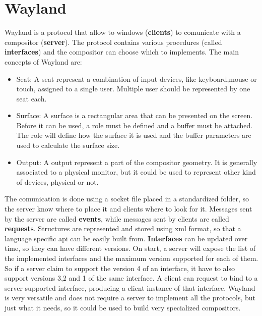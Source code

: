 \chapter{Wayland}
Wayland is a protocol that allow to windows (\textbf{clients}) to comunicate with a compositor (\textbf{server}).
The protocol contains various procedures (called \textbf{interfaces}) and the compositor can choose which to implements.
The main concepts of Wayland are:
\begin{itemize}
	\item Seat: A seat represent a combination of input devices, like keyboard,mouse or touch, assigned to a single user. Multiple user should be represented by one seat each.
	\item Surface: A surface is a rectangular area that can be presented on the screen. Before it can be used, a role must be defined and a buffer must be attached. The role will define how the surface it is used and the buffer parameters are used to calculate the surface size.
	\item Output: A output represent a part of the compositor geometry. It is generally associated to a physical monitor, but it could be used to represent other kind of devices, physical or not.  
\end{itemize}

The comunication is done using a socket file placed in a standardized folder, so the server know where to place it and clients where to look for it.
Messages sent by the server are called \textbf{events}, while messages sent by clients are called \textbf{requests}.
Structures are represented and stored using xml format, so that a language specific api can be easily built from. \textbf{Interfaces} can be updated over time, so they can have different versions.
On start, a server will expose the list of the implemented interfaces and the maximum version supported for each of them. So if a server claim to support the version 4 of an interface, it have to also support versions 3,2 and 1 of the same interface. 
A client can request to bind to a server supported interface, producing a client instance of that interface.
Wayland is very versatile and does not require a server to implement all the protocols, but just what it needs, so it could be used to build very specialized compositors.

